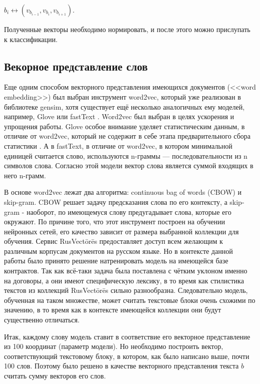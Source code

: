 \documentclass[12pt]{article}
\begin{document}
\begin{center}
	$b_i \leftrightarrow (v_{b_{i-1}}, v_{b_i}, v_{b_{i+1}})$.
\end{center}

Полученные векторы необходимо нормировать, и после этого можно прислупать к классификации.

\subsection{Векорное представление слов}

Еще одним способом векторного представления имеющихся документов (<<word embedding>>) был выбран инструмент word2vec, который уже реализован в библиотеке gensim, хотя существует ещё несколько аналогичных ему моделей, например, Glove \cite{glove} или fastText \cite{fasttext}. Word2vec был выбран в целях ускорения и упрощения работы. Glove особое внимание уделяет статистическим данным, в отличие от word2vec, который не содержит в себе этапа предварительного сбора статистики \cite{zakirov, predict}. А в fastText, в отличие от word2vec, в котором минимальной единицей считается слово, используются n-граммы — последовательности из n символов слова. Согласно этой модели вектор слова является суммой входящих в него n-грамм.

В основе word2vec лежат два алгоритма: continuous bag of words (CBOW) и skip-gram. CBOW решает задачу предсказания слова по его контексту, а skip-gram - наоборот, по имеющемуся слову предугадывает слова, которые его окружают. По причине того, что этот инструмент построен на обучении нейронных сетей, его качество зависит от размера выбранной коллекции для обучения. Сервис RusVectōrēs предоставляет доступ всем желающим к различным корпусам документов на русском языке. Но в контексте данной работы было принято решение натренировать модель на имеющейся базе контрактов. Так как всё-таки задача была поставлена с чётким уклоном именно на договоры, а они имеют специфическую лексику, в то время как стилистика текстов из коллекций RusVectōrēs сильно разнообразна. Следовательно модель, обученная на таком множестве, может считать текстовые блоки очень схожими по значению, в то время как в контексте имеющейся коллекции они будут существенно отличаться. 

Итак, каждому слову модель ставит в соответствие его векторное представление из 100 координат (параметр модели). Но необходимо построить вектор, соответствующий текстовому блоку, в котором, как было написано выше, почти 100 слов. Поэтому было решено в качестве векторного представления текста $b$ считать сумму векторов его слов. 
	
\end{document}
